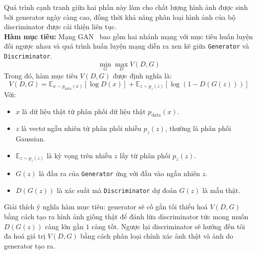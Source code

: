 Quá trình cạnh tranh giữa hai phần này làm cho chất lượng hình ảnh được sinh bởi \gls{generator} ngày càng cao, đồng thời khả năng phân loại hình ảnh của bộ \gls{discriminator} được cải thiện liên tục.\\
%
 \textbf{Hàm mục tiêu:}
%
Mạng GAN~\cite{Goodfellow2014GenerativeAN} bao gồm hai nhánh mạng với mục tiêu huấn luyện đối ngược nhau và quá trình huấn luyện mạng diễn ra xen kẽ giữa \texttt{Generator} và \texttt{Discriminator}.\\
\[
\min_G \max_D V(D, G)
\]
Trong đó, hàm mục tiêu \( V(D, G) \) được định nghĩa là:
\[
V(D, G) = \mathbb{E}_{x \sim p_{\text{data}}(x)} \left[ \log D(x) \right] + \mathbb{E}_{z \sim p_z(z)} \left[ \log (1 - D(G(z))) \right]
\]
%
Với:
\begin{itemize}
	\item \(x\) là dữ liệu thật từ phân phối dữ liệu thật \(p_{\text{data}}(x)\).
	\item \(z\) là vectơ ngẫu nhiên từ phân phối nhiễu \(p_z(z)\), thường là phân phối Gaussian.
	\item \( \mathbb{E}_{z \sim p_z(z)} \) là kỳ vọng trên nhiễu \( z \) lấy từ phân phối \( p_z(z) \).
	\item \( G(z) \) là đầu ra của \texttt{Generator} ứng với đầu vào ngẫu nhiên $z$.
	\item \( D(G(z)) \) là xác suất mà \texttt{Discriminator} dự đoán \( G(z) \) là mẫu thật.

\end{itemize}
%
Giải thích ý nghĩa hàm mục tiêu: \gls{generator} sẽ cố gắn tối thiểu hoá $V(D,G)$ bằng cách tạo ra hình ảnh giống thật để đánh lừa \gls{discriminator} tức mong muốn $D(G(z))$ càng lớn gần \(1\) càng tốt. Ngược lại \gls{discriminator} sẽ hướng đến tôi đa hoá giá trị  $V(D,G)$  bằng cách phân loại chính xác ảnh thật và ảnh do \gls{generator} tạo ra.
%
%
